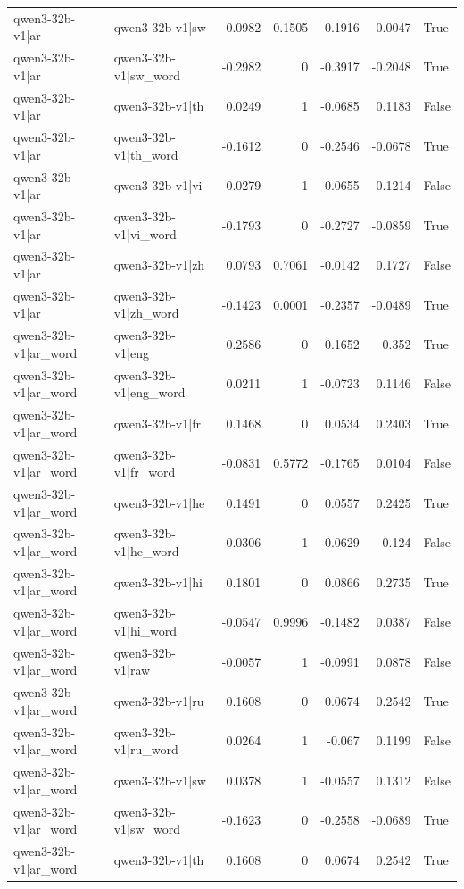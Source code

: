 \begin{table}
\begin{tabular}{l l r r r r l}
qwen3-32b-v1|ar & qwen3-32b-v1|sw & -0.0982 & 0.1505 & -0.1916 & -0.0047 & True \\
qwen3-32b-v1|ar & qwen3-32b-v1|sw_word & -0.2982 & 0 & -0.3917 & -0.2048 & True \\
qwen3-32b-v1|ar & qwen3-32b-v1|th & 0.0249 & 1 & -0.0685 & 0.1183 & False \\
qwen3-32b-v1|ar & qwen3-32b-v1|th_word & -0.1612 & 0 & -0.2546 & -0.0678 & True \\
qwen3-32b-v1|ar & qwen3-32b-v1|vi & 0.0279 & 1 & -0.0655 & 0.1214 & False \\
qwen3-32b-v1|ar & qwen3-32b-v1|vi_word & -0.1793 & 0 & -0.2727 & -0.0859 & True \\
qwen3-32b-v1|ar & qwen3-32b-v1|zh & 0.0793 & 0.7061 & -0.0142 & 0.1727 & False \\
qwen3-32b-v1|ar & qwen3-32b-v1|zh_word & -0.1423 & 0.0001 & -0.2357 & -0.0489 & True \\
qwen3-32b-v1|ar_word & qwen3-32b-v1|eng & 0.2586 & 0 & 0.1652 & 0.352 & True \\
qwen3-32b-v1|ar_word & qwen3-32b-v1|eng_word & 0.0211 & 1 & -0.0723 & 0.1146 & False \\
qwen3-32b-v1|ar_word & qwen3-32b-v1|fr & 0.1468 & 0 & 0.0534 & 0.2403 & True \\
qwen3-32b-v1|ar_word & qwen3-32b-v1|fr_word & -0.0831 & 0.5772 & -0.1765 & 0.0104 & False \\
qwen3-32b-v1|ar_word & qwen3-32b-v1|he & 0.1491 & 0 & 0.0557 & 0.2425 & True \\
qwen3-32b-v1|ar_word & qwen3-32b-v1|he_word & 0.0306 & 1 & -0.0629 & 0.124 & False \\
qwen3-32b-v1|ar_word & qwen3-32b-v1|hi & 0.1801 & 0 & 0.0866 & 0.2735 & True \\
qwen3-32b-v1|ar_word & qwen3-32b-v1|hi_word & -0.0547 & 0.9996 & -0.1482 & 0.0387 & False \\
qwen3-32b-v1|ar_word & qwen3-32b-v1|raw & -0.0057 & 1 & -0.0991 & 0.0878 & False \\
qwen3-32b-v1|ar_word & qwen3-32b-v1|ru & 0.1608 & 0 & 0.0674 & 0.2542 & True \\
qwen3-32b-v1|ar_word & qwen3-32b-v1|ru_word & 0.0264 & 1 & -0.067 & 0.1199 & False \\
qwen3-32b-v1|ar_word & qwen3-32b-v1|sw & 0.0378 & 1 & -0.0557 & 0.1312 & False \\
qwen3-32b-v1|ar_word & qwen3-32b-v1|sw_word & -0.1623 & 0 & -0.2558 & -0.0689 & True \\
qwen3-32b-v1|ar_word & qwen3-32b-v1|th & 0.1608 & 0 & 0.0674 & 0.2542 & True \\

\end{tabular}
\end{table}
